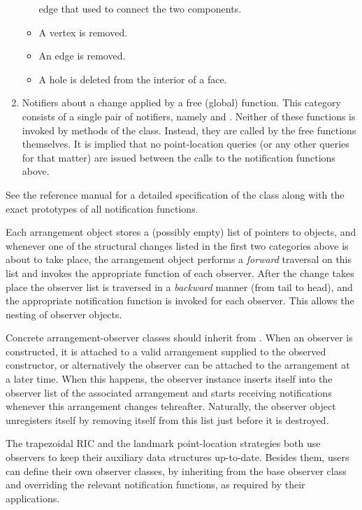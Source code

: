 \begin{enumerate}
\begin{itemize}
edge that used to connect the two components.
\item A vertex is removed.
\item An edge is removed.
\item A hole is deleted from the interior of a face.
\end{itemize}
\item Notifiers about a change applied by a free (global) function.
This category consists of a single pair of notifiers, namely
 and . Neither of
these functions is invoked by methods of the  class. 
Instead, they are called by the free functions themselves. It is implied 
that no point-location queries (or any other queries for that matter)
are issued between the calls to the notification functions above.
\end{enumerate}
See the reference manual for a detailed specification of the
 class along with the exact prototypes of all
notification functions.

Each arrangement object stores a (possibly empty) list of pointers to
 objects, and whenever one of the structural
changes listed in the first two categories above is about to take
place, the arrangement object performs a {\em forward} traversal
on this list and invokes the appropriate function of each
observer. After the change takes place the observer list is
traversed in a {\em backward} manner (from tail to head), and the
appropriate notification function is invoked for each observer.
This allows the nesting of observer objects.

Concrete arrangement-observer classes should inherit from
. When an observer is constructed, it is attached to
a valid arrangement supplied to the observed constructor, or alternatively 
the observer can be attached to the arrangement at a later time.
When this happens, the observer instance inserts itself into the
observer list of the associated arrangement and starts receiving
notifications whenever this arrangement changes tehreafter. Naturally,
the observer object unregisters itself by removing itself from
this list just before it is destroyed.

The trapezoidal RIC and the landmark point-location strategies
both use observers to keep their auxiliary data structures
up-to-date. Besides them, users can define their own observer
classes, by inheriting from the base observer class and overriding
the relevant notification functions, as required by their
applications.

